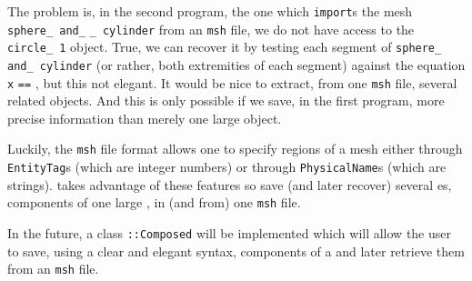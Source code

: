 The problem is, in the second {\maniFEM} program, the one which {\small\tt import}s the mesh
{\small\tt sphere\_\,and\_} {\small\tt\_\,cylinder} from an {\small\tt msh} file,
we do not have access to the {\small\tt circle\_\,1} object.
True, we can recover it by testing each segment of {\small\tt sphere\_\,and\_\,cylinder}
(or rather, both extremities of each segment) against the equation {\small\tt x} {\small\tt ==}
{\small\tt{}}, but this not elegant.
It would be nice to extract, from one {\small\tt msh} file, several related
{\small\tt{}} objects.
And this is only possible if we save, in the first {\maniFEM} program, more precise information
than merely one large {\small\tt{}} object.

Luckily, the {\small\tt msh} file format allows one to specify regions of a mesh
either through {\small\tt EntityTag}s (which are integer numbers)
or through {\small\tt PhysicalName}s (which are strings).
{\ManiFEM} takes advantage of these features so save (and later recover) several
{\small\tt{}}es, components of one large {\small\tt{}}, in (and from)
one {\small\tt msh} file.

In the future, a class {\small\tt{}::Composed} will be implemented which will
allow the user to save, using a clear and elegant syntax, components of a {\small\tt{}}
and later retrieve them  from an {\small\tt msh} file.

